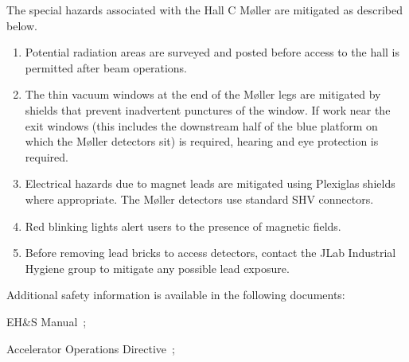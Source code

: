\begin{safetyen}{0}{0}
The special hazards associated with the Hall C M\o ller are mitigated as
described below.

\begin{enumerate}
        \item{Potential radiation areas are surveyed and posted before access to the hall is permitted
        after beam operations.}
        \item{The thin vacuum windows at the end of the M\o ller legs are mitigated by shields that prevent inadvertent
        punctures of the window. If work near the exit windows (this includes the downstream half of the blue platform
        on which the M\o ller detectors sit) is required, hearing and eye protection is required.}
        \item{Electrical hazards due to magnet leads are mitigated using Plexiglas shields where appropriate.
        The M\o ller detectors use standard SHV connectors.}
        \item{Red blinking lights alert users to the presence of magnetic fields.}
        \item{Before removing lead bricks to access detectors, contact the JLab Industrial Hygiene group to mitigate any possible
        lead exposure.}
\end{enumerate}

\noindent{}Additional safety information is available in the following documents:
\begin{list}{--}{\setlength{\itemsep}{-0.15cm}}
  \item EH\&S Manual~\cite{EHScebaf};
  \item Accelerator Operations Directive~\cite{AODcebaf};
\end{list}



\end{safetyen}
